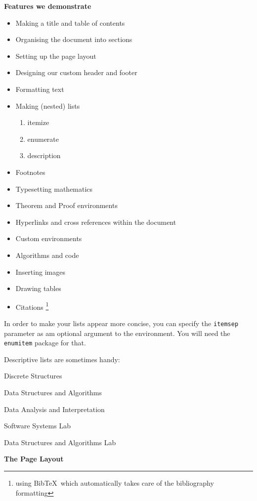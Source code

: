\documentclass[10pt, Computer Modern]{article}
\begin{document}
\textbf{ Features we demonstrate}
\begin{itemize}
	\item Making a title and table of contents
	\item Organising the document into sections
	\item Setting up the page layout
	\item Designing our custom header and footer
	\item Formatting text
	\item Making (nested) lists
	\begin{enumerate}[noitemsep]
		\item itemize
		\item enumerate 
		\item description
	\end{enumerate}	
	\item Footnotes
	\item Typesetting mathematics
	\item Theorem and Proof environments
	\item Hyperlinks and cross references within the document 
	\item Custom environments
	\item Algorithms and code
	\item Inserting images
	\item Drawing tables
	\item \renewcommand{\thefootnote}{\fnsymbol{footnote}}
			Citations \footnote{using Bib\TeX\, which automatically takes care of the bibliography formatting}
\end{itemize}	
In order to make your lists appear more concise, you can specify the \verb!itemsep! parameter as am optional argument to the environment. You will need the \verb!enumitem! package for that.



Descriptive lists are sometimes handy:


\begin{description}[noitemsep]
	\item [CS 207] Discrete Structures
	\item [CS 213] Data Structures and Algorithms
	\item [CS 215] Data Analysis and Interpretation
	\item [CS 251] Software Systems Lab
	\item [CS 293] Data Structures and Algorithms Lab
\end{description}	
\textbf{The Page Layout}
\end{document}
